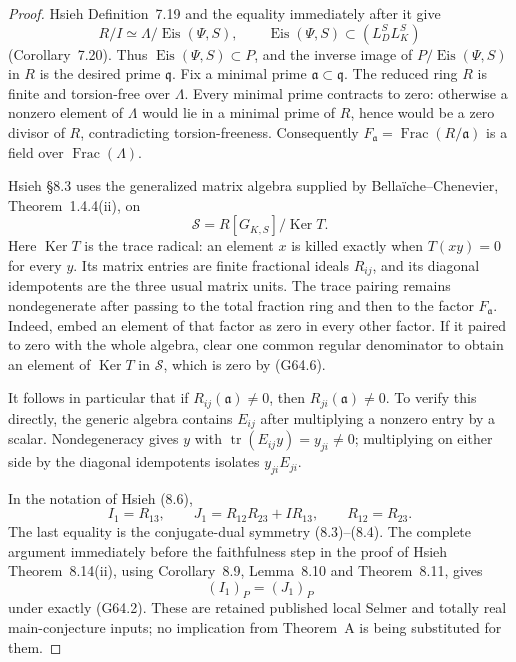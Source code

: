 \begin{proof}
Hsieh Definition~7.19 and the equality immediately after it give
\[
 R/I\simeq\Lambda/\operatorname{Eis}(\Psi,S),
 \qquad \operatorname{Eis}(\Psi,S)\subset(L_D^SL_K^S)
                                                               \tag{G64.5}
\]
(Corollary~7.20).  Thus $\operatorname{Eis}(\Psi,S)\subset P$,
and the inverse image of $P/\operatorname{Eis}(\Psi,S)$ in $R$
is the desired prime $\mathfrak q$.  Fix a minimal prime
$\mathfrak a\subset\mathfrak q$.
The reduced ring $R$ is finite and torsion-free over $\Lambda$.
Every minimal prime contracts to zero: otherwise a nonzero
element of $\Lambda$ would lie in a minimal prime of $R$, hence
would be a zero divisor of $R$, contradicting torsion-freeness.
Consequently $F_{\mathfrak a}=\operatorname{Frac}(R/\mathfrak a)$
is a field over $\operatorname{Frac}(\Lambda)$.

Hsieh \S8.3 uses the generalized matrix algebra supplied by
Bella\"iche--Chenevier, Theorem~1.4.4(ii), on
\[
                  \mathscr S=R[G_{K,S}]/\operatorname{Ker}T.
                                                               \tag{G64.6}
\]
Here $\operatorname{Ker}T$ is the trace radical: an element $x$
is killed exactly when $T(xy)=0$ for every $y$.
Its matrix entries are finite fractional ideals $R_{ij}$,
and its diagonal idempotents are the three usual matrix units.
The trace pairing remains nondegenerate after passing to the
total fraction ring and then to the factor $F_{\mathfrak a}$.
Indeed, embed an element of that factor as zero in every other
factor.  If it paired to zero with the whole algebra, clear one
common regular denominator to obtain an element of
$\operatorname{Ker}T$ in $\mathscr S$, which is zero by (G64.6).

It follows in particular that if $R_{ij}(\mathfrak a)\ne0$,
then $R_{ji}(\mathfrak a)\ne0$.  To verify this directly, the
generic algebra contains $E_{ij}$ after multiplying a nonzero
entry by a scalar.  Nondegeneracy gives $y$ with
$\operatorname{tr}(E_{ij}y)=y_{ji}\ne0$; multiplying on either
side by the diagonal idempotents isolates $y_{ji}E_{ji}$.

In the notation of Hsieh (8.6),
\[
 I_1=R_{13},\qquad J_1=R_{12}R_{23}+IR_{13},
 \qquad R_{12}=R_{23}.                                   \tag{G64.7}
\]
The last equality is the conjugate-dual symmetry (8.3)--(8.4).
The complete argument immediately before the faithfulness step
in the proof of Hsieh Theorem~8.14(ii), using Corollary~8.9,
Lemma~8.10 and Theorem~8.11, gives
\[
                         (I_1)_P=(J_1)_P                  \tag{G64.8}
\]
under exactly (G64.2).  These are retained published local
Selmer and totally real main-conjecture inputs; no implication
from Theorem~A is being substituted for them.


\end{proof}
